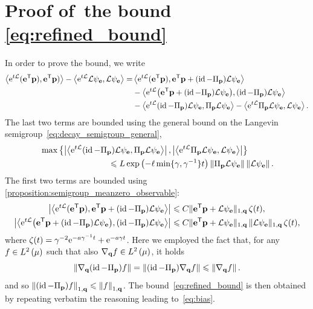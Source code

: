 \documentclass[11pt,a4paper]{article}
\begin{document}
\section{Proof of~\texorpdfstring{the bound \eqref{eq:refined_bound}}{the technical bound on the bias}}%
\label{sec:proof_technical_result}
In order to prove the bound,
we write
\begin{align*}
    \ip{\e^{t \mathcal L}(\vect e^\t \vect p)}{\vect e^\t \vect p)} - \ip{\e^{t \mathcal L} \mathcal L \psi_{\vect e}}{\mathcal L \psi_{\vect e}}
    = &\ip{\e^{t \mathcal L} (\vect e^\t \vect p)}{\vect e^\t \vect p + (\id - \Pi_{\vect p}) \mathcal L \psi_{\vect e}} \\
    & - \ip{\e^{t \mathcal L} \bigl(\vect e^\t \vect p + (\id - \Pi_{\vect p}) \mathcal L \psi_{\vect e}\bigr)}{(\id - \Pi_{\vect p}) \mathcal L \psi_{\vect e}} \\
    & - \ip{\e^{t \mathcal L} (\id - \Pi_{\vect p}) \mathcal L \psi_{\vect e}}{\Pi_{\vect p} \mathcal L \psi_{\vect e}}
    - \ip{\e^{t \mathcal L} \Pi_{\vect p} \mathcal L \psi_{\vect e}}{\mathcal L \psi_{\vect e}}.
\end{align*}
The last two terms are bounded using the general bound on the Langevin semigroup~\eqref{eq:decay_semigroup_general},
\begin{align*}
    &\max \left\{
    \abs{\ip{\e^{t \mathcal L} (\id - \Pi_{\vect p}) \mathcal L \psi_{\vect e}}{\Pi_{\vect p} \mathcal L \psi_{\vect e}}},
    \abs{\ip{\e^{t \mathcal L} \Pi_{\vect p} \mathcal L \psi_{\vect e}}{\mathcal L \psi_{\vect e}}}
    \right\} \\
    &\qquad \qquad \qquad \qquad \leq L \exp \left( - \ell \min\{\gamma, \gamma^{-1}\} t\right) \norm{\Pi_{\vect p} \mathcal L \psi_{\vect e}} \norm{\mathcal L \psi_{\vect e}}.
\end{align*}
The first two terms are bounded using \cref{proposition:semigroup_meanzero_observable}:
\begin{align*}
    \abs{\ip{\e^{t \mathcal L} (\vect e^\t \vect p)}{\vect e^\t \vect p + (\id - \Pi_{\vect p}) \mathcal L \psi_{\vect e}}}
    &\leq C \norm*{\vect e^\t \vect p + \mathcal L \psi_{\vect e}}[1,\vect q] \, \zeta(t), \\
    \abs{\ip{\e^{t \mathcal L} \bigl(\vect e^\t \vect p + (\id - \Pi_{\vect p}) \mathcal L \psi_{\vect e}\bigr)}{(\id - \Pi_{\vect p}) \mathcal L \psi_{\vect e}}}
    &\leq C \norm*{\vect e^\t \vect p + \mathcal L \psi_{\vect e}}[1,\vect q] \, \norm*{\mathcal L \psi_{\vect e}}[1,\vect q] \, \zeta(t),
\end{align*}
where $\zeta(t) = \gamma^{-2} \mathrm{e}^{- a \gamma^{-1} t } + \mathrm{e}^{- a \gamma t}$.
Here we employed the fact that, for any $f \in \lp{2}{\mu}$ such that also $\grad_{\vect q} f \in \lp{2}{\mu}$,
it holds
\[
    \norm{\grad_{\vect q} (\id - \Pi_{\vect p}) f}
    = \norm{(\id - \Pi_{\vect p}) \grad_{\vect q} f}
    \leq \norm{\grad_{\vect q} f}.
\]
and so $\norm{(\id - \Pi_{\vect p}) f}[1,\vect q] \leq \norm{f}[1,\vect q]$.
The bound~\eqref{eq:refined_bound} is then obtained by repeating verbatim the reasoning leading to~\eqref{eq:bias}.
\end{document}
